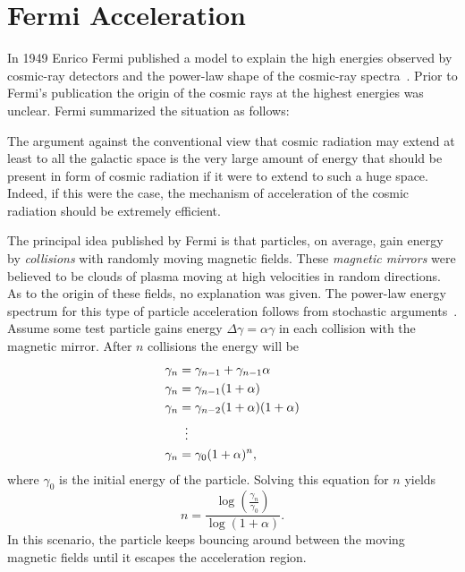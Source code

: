 \section{Fermi Acceleration}
\label{sec:fermi}
In 1949 Enrico Fermi published a model to explain the high energies observed by cosmic-ray detectors and the power-law shape of the cosmic-ray spectra~\cite{fermi_original}.
Prior to Fermi's publication the origin of the cosmic rays at the highest energies was unclear. 
Fermi summarized the situation as follows:
\begin{displayquote}
  The argument against the conventional view that cosmic radiation may extend at least to all the galactic 
  space is the very large amount of energy that should be present in form of cosmic radiation if it were to extend to such a huge space.
  Indeed, if this were the case, the mechanism of acceleration of the cosmic radiation should be extremely efficient.
\end{displayquote}
The principal idea published by Fermi is that particles, on average, gain energy by \emph{collisions} with randomly moving magnetic fields.
These \emph{magnetic mirrors} were believed to be clouds of plasma moving at high velocities in random directions.
As to the origin of these fields, no explanation was given.
The power-law energy spectrum for this type of particle acceleration follows from stochastic arguments~\cite[\S12.2.1]{gaisser}.
Assume some test particle gains energy $\Delta \gamma = \alpha \gamma$ in each collision with the magnetic mirror.
After $n$ collisions the energy will be
\begin{align*}
  \gamma_n &= \gamma_{n-1} + \gamma_{n-1} \alpha \\
  \gamma_n &= \gamma_{n-1}(1 + \alpha) \\
  \gamma_n &= \gamma_{n-2}(1 + \alpha)(1 + \alpha) \\
  &\setbox0\hbox{=}\mathrel{\makebox[\wd0]{\hfil\vdots\hfil}} \\ %
  \gamma_n &= \gamma_0 (1 + \alpha)^n,
\end{align*}
where $\gamma_0$ is the initial energy of the particle. Solving this equation for $n$ yields
\begin{equation*}
    n = \frac{\log\left(\frac{\gamma_n}{\gamma_0}\right)}{\log(1 + \alpha)}.
\end{equation*}
In this scenario, the particle keeps bouncing around between the moving magnetic fields until it escapes the acceleration region.

